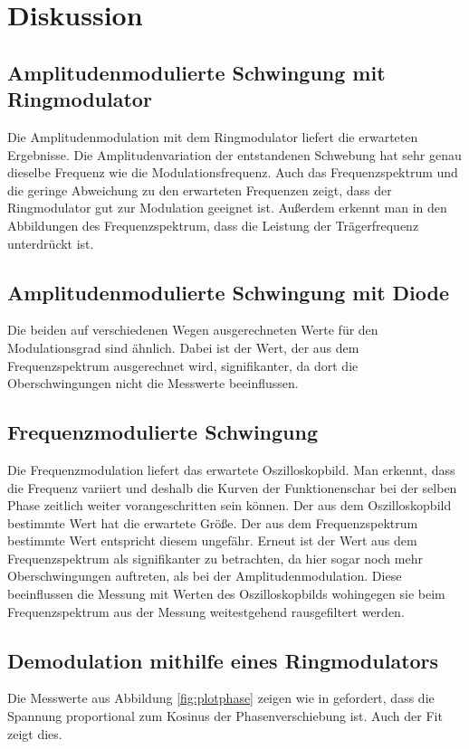 \section{Diskussion}
\label{sec:Diskussion}

\subsection{Amplitudenmodulierte Schwingung mit Ringmodulator}
Die Amplitudenmodulation mit dem Ringmodulator liefert die erwarteten Ergebnisse. Die Amplitudenvariation der entstandenen Schwebung hat sehr genau dieselbe Frequenz  wie die Modulationsfrequenz. Auch das Frequenzspektrum und die geringe Abweichung zu den erwarteten Frequenzen zeigt, dass der Ringmodulator gut zur Modulation geeignet ist. Außerdem erkennt man in den Abbildungen des Frequenzspektrum, dass die Leistung der Trägerfrequenz unterdrückt ist.

\subsection{Amplitudenmodulierte Schwingung mit Diode}
Die beiden auf verschiedenen Wegen ausgerechneten Werte für den Modulationsgrad sind ähnlich. Dabei ist der Wert, der aus dem Frequenzspektrum ausgerechnet wird, signifikanter, da dort die Oberschwingungen nicht die Messwerte beeinflussen.

\subsection{Frequenzmodulierte Schwingung}
Die Frequenzmodulation liefert das erwartete Oszilloskopbild. Man erkennt, dass die Frequenz variiert und deshalb die Kurven der Funktionenschar bei der selben Phase zeitlich weiter vorangeschritten sein können. Der aus dem Oszilloskopbild bestimmte Wert hat die erwartete Größe.
Der aus dem Frequenzspektrum bestimmte Wert entspricht diesem ungefähr. Erneut ist der Wert aus dem Frequenzspektrum als signifikanter zu betrachten, da hier sogar noch mehr Oberschwingungen auftreten, als bei der Amplitudenmodulation. Diese beeinflussen die Messung mit Werten des Oszilloskopbilds wohingegen sie beim Frequenzspektrum aus der Messung weitestgehend rausgefiltert werden.


\subsection{Demodulation mithilfe eines Ringmodulators}
Die Messwerte aus Abbildung \ref{fig:plotphase} zeigen  wie in \cite{anleitung} gefordert, dass die Spannung proportional zum Kosinus der Phasenverschiebung ist. Auch der Fit zeigt dies.

